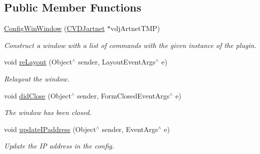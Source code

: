 \subsection*{Public Member Functions}
\begin{DoxyCompactItemize}
\item 
\mbox{\label{classConfigWinWindow_a450c1273eeacf866a5cbdc77899c59f1}} 
\hyperlink{classConfigWinWindow_a450c1273eeacf866a5cbdc77899c59f1}{Config\+Win\+Window} (\hyperlink{classCVDJartnet}{C\+V\+D\+Jartnet} $\ast$vdj\+Artnet\+T\+MP)
\begin{DoxyCompactList}\small\item\em Construct a window with a list of commands with the given instance of the plugin. \end{DoxyCompactList}\item 
\mbox{\label{classConfigWinWindow_a3181fb8df8491c448b0afe6011d9b71d}} 
void \hyperlink{classConfigWinWindow_a3181fb8df8491c448b0afe6011d9b71d}{re\+Layout} (Object$^\wedge$ sender, Layout\+Event\+Args$^\wedge$ e)
\begin{DoxyCompactList}\small\item\em Relayout the window. \end{DoxyCompactList}\item 
\mbox{\label{classConfigWinWindow_af0ef395b86d59a38d4d5bb8f978c63f4}} 
void \hyperlink{classConfigWinWindow_af0ef395b86d59a38d4d5bb8f978c63f4}{did\+Close} (Object$^\wedge$ sender, Form\+Closed\+Event\+Args$^\wedge$ e)
\begin{DoxyCompactList}\small\item\em The window has been closed. \end{DoxyCompactList}\item 
\mbox{\label{classConfigWinWindow_a89a9b6154e716142854ecbec1eaccb15}} 
void \hyperlink{classConfigWinWindow_a89a9b6154e716142854ecbec1eaccb15}{update\+I\+Paddress} (Object$^\wedge$ sender, Event\+Args$^\wedge$ e)
\begin{DoxyCompactList}\small\item\em Update the IP address in the config. \end{DoxyCompactList}\item 
\mbox{\label{classConfigWinWindow_ac1a7295061c09db580be48222baef958}} 

\end{DoxyCompactItemize}
